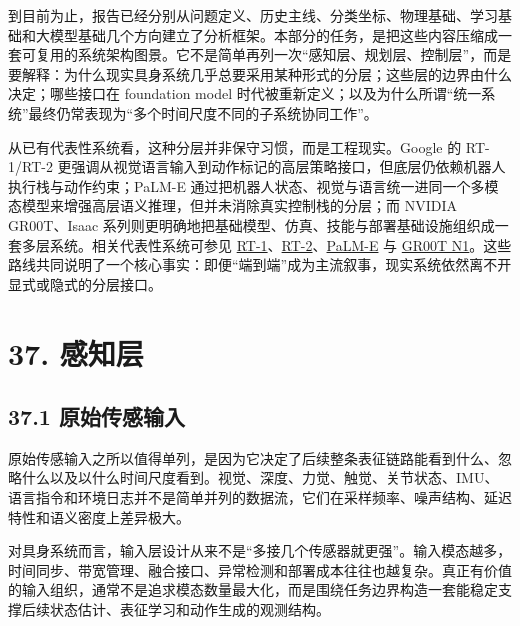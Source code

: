 

到目前为止，报告已经分别从问题定义、历史主线、分类坐标、物理基础、学习基础和大模型基础几个方向建立了分析框架。本部分的任务，是把这些内容压缩成一套可复用的系统架构图景。它不是简单再列一次“感知层、规划层、控制层”，而是要解释：为什么现实具身系统几乎总要采用某种形式的分层；这些层的边界由什么决定；哪些接口在 foundation model 时代被重新定义；以及为什么所谓“统一系统”最终仍常表现为“多个时间尺度不同的子系统协同工作”。

从已有代表性系统看，这种分层并非保守习惯，而是工程现实。Google 的 RT-1/RT-2 更强调从视觉语言输入到动作标记的高层策略接口，但底层仍依赖机器人执行栈与动作约束；PaLM-E 通过把机器人状态、视觉与语言统一进同一个多模态模型来增强高层语义推理，但并未消除真实控制栈的分层；而 NVIDIA GR00T、Isaac 系列则更明确地把基础模型、仿真、技能与部署基础设施组织成一套多层系统。相关代表性系统可参见 \href{https://robotics-transformer1.github.io/}{RT-1}、\href{https://robotics-transformer2.github.io/}{RT-2}、\href{https://arxiv.org/abs/2303.03378}{PaLM-E} 与 \href{https://developer.nvidia.com/blog/introducing-nvidia-isaac-gr00t-n1-an-open-foundation-model-for-humanoid-robot-development/}{GR00T N1}。这些路线共同说明了一个核心事实：即便“端到端”成为主流叙事，现实系统依然离不开显式或隐式的分层接口。

\section*{37. 感知层}

\subsection*{37.1 原始传感输入}


原始传感输入之所以值得单列，是因为它决定了后续整条表征链路能看到什么、忽略什么以及以什么时间尺度看到。视觉、深度、力觉、触觉、关节状态、IMU、语言指令和环境日志并不是简单并列的数据流，它们在采样频率、噪声结构、延迟特性和语义密度上差异极大。

对具身系统而言，输入层设计从来不是“多接几个传感器就更强”。输入模态越多，时间同步、带宽管理、融合接口、异常检测和部署成本往往也越复杂。真正有价值的输入组织，通常不是追求模态数量最大化，而是围绕任务边界构造一套能稳定支撑后续状态估计、表征学习和动作生成的观测结构。

